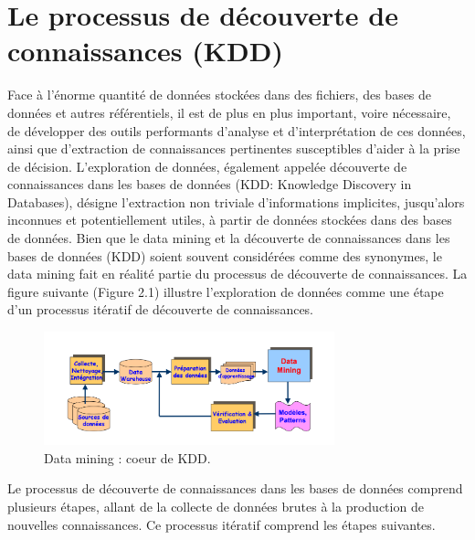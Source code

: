 \documentclass[a4paper,12pt]{report}
\begin{document}
    \section{Le processus de découverte de connaissances (KDD)}
        Face à l'énorme quantité de données stockées dans des fichiers, des bases de données et autres référentiels, il est de plus en plus important, voire nécessaire, de développer des outils performants d'analyse et d'interprétation de ces données, ainsi que d'extraction de connaissances pertinentes susceptibles d'aider à la prise de décision.
        L'exploration de données, également appelée découverte de connaissances dans les bases de données (KDD: Knowledge Discovery in Databases), désigne l'extraction non triviale d'informations implicites, jusqu'alors inconnues et potentiellement utiles, à partir de données stockées dans des bases de données. Bien que le data mining et la découverte de connaissances dans les bases de données (KDD) soient souvent considérées comme des synonymes, le data mining fait en réalité partie du processus de découverte de connaissances. La figure suivante (Figure 2.1) illustre l'exploration de données comme une étape d'un processus itératif de découverte de connaissances.

        \begin{figure}[h]
            \centering
            \includegraphics[width=0.75\textwidth]{KDD_data_mining}
            \caption{Data mining : coeur de KDD.}
            \label{fig:mesh1}
        \end{figure}        

        Le processus de découverte de connaissances dans les bases de données comprend plusieurs étapes, allant de la collecte de données brutes à la production de nouvelles connaissances. Ce processus itératif comprend les étapes suivantes.
\end{document}

